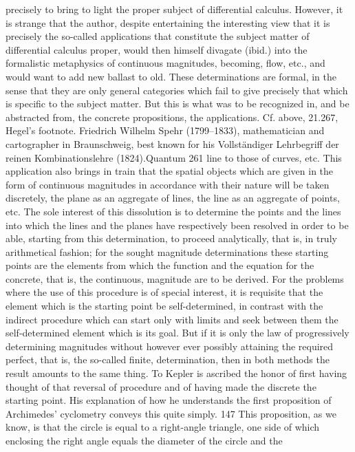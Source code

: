 precisely to bring to light the proper subject of differential calculus. However, it is strange that the
author, despite entertaining the interesting view that it is precisely the so-called applications that
constitute the subject matter of differential calculus proper, would then himself divagate (ibid.)
into the formalistic metaphysics of continuous magnitudes, becoming, flow, etc., and would want to
add new ballast to old. These determinations are formal, in the sense that they are only general
categories which fail to give precisely that which is specific to the subject matter. But this is what was
to be recognized in, and be abstracted from, the concrete propositions, the applications.
Cf. above, 21.267, Hegel’s footnote.
Friedrich Wilhelm Spehr (1799–1833), mathematician and cartographer in Braunschweig, best
known for his Vollständiger Lehrbegriff der reinen Kombinationslehre (1824).Quantum
261
line to those of curves, etc. This application also brings in train that
the spatial objects which are given in the form of continuous magnitudes
in accordance with their nature will be taken discretely, the plane as an
aggregate of lines, the line as an aggregate of points, etc. The sole interest
of this dissolution is to determine the points and the lines into which
the lines and the planes have respectively been resolved in order to be
able, starting from this determination, to proceed analytically, that is, in
truly arithmetical fashion; for the sought magnitude determinations these
starting points are the elements from which the function and the equation
for the concrete, that is, the continuous, magnitude are to be derived. For
the problems where the use of this procedure is of special interest, it is
requisite that the element which is the starting point be self-determined,
in contrast with the indirect procedure which can start only with limits
and seek between them the self-determined element which is its goal.
But if it is only the law of progressively determining magnitudes without
however ever possibly attaining the required perfect, that is, the so-called
finite, determination, then in both methods the result amounts to the
same thing. To Kepler is ascribed the honor of first having thought of
that reversal of procedure and of having made the discrete the starting
point. His explanation of how he understands the first proposition of
Archimedes’ cyclometry conveys this quite simply. 147 This proposition, as
we know, is that the circle is equal to a right-angle triangle, one side of
which enclosing the right angle equals the diameter of the circle and the

